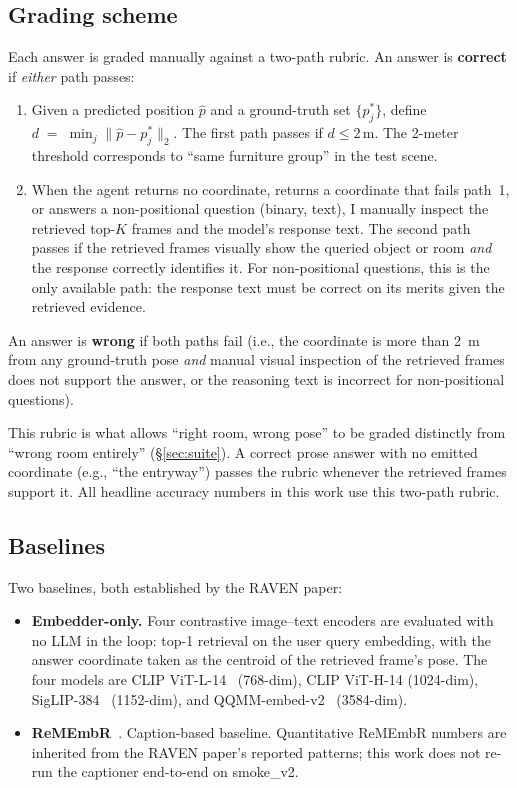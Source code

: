 \documentclass[12pt,letterpaper,oneside]{article}
\begin{document}
\subsection{Grading scheme}\label{sec:grading}

Each answer is graded manually against a two-path rubric.  An answer
is \textbf{correct} if \emph{either} path passes:

\begin{enumerate}
  \item Given a predicted position $\hat{p}$ and a ground-truth set
    $\{p^*_j\}$, define $d \;=\; \min_j \|\hat{p} - p^*_j\|_2$.
    The first path passes if $d \le 2\,$m.  The 2-meter threshold
    corresponds to ``same furniture group'' in the test scene.
  \item When the agent returns no coordinate, returns a coordinate
    that fails path~1, or answers a non-positional question (binary,
    text), I manually inspect the retrieved top-$K$ frames and the
    model's response text.  The second path passes if the retrieved
    frames visually show the queried object or room \emph{and} the
    response correctly identifies it.  For non-positional questions,
    this is the only available path: the response text must be
    correct on its merits given the retrieved evidence.
\end{enumerate}

An answer is \textbf{wrong} if both paths fail (i.e., the coordinate
is more than 2~m from any ground-truth pose \emph{and} manual visual
inspection of the retrieved frames does not support the answer, or
the reasoning text is incorrect for non-positional questions).

This rubric is what allows ``right room, wrong pose'' to be graded
distinctly from ``wrong room entirely'' (\S\ref{sec:suite}). A
correct prose answer with no emitted coordinate (e.g., ``the
entryway'') passes the rubric whenever the retrieved frames support
it.  All headline accuracy numbers in this work use this two-path
rubric.

\subsection{Baselines}

Two baselines, both established by the RAVEN paper:

\begin{itemize}
  \item \textbf{Embedder-only.}  Four contrastive image--text encoders
    are evaluated with no LLM in the loop: top-1 retrieval on the user
    query embedding, with the answer coordinate taken as the centroid
    of the retrieved frame's pose.  The four models are CLIP
    ViT-L-14~\cite{ref:clip} (768-dim), CLIP ViT-H-14 (1024-dim),
    SigLIP-384~\cite{ref:siglip} (1152-dim), and
    QQMM-embed-v2~\cite{ref:qqmm} (3584-dim).
  \item \textbf{ReMEmbR}~\cite{ref:remembr}.  Caption-based baseline.
    Quantitative ReMEmbR numbers are inherited from the RAVEN paper's
    reported patterns; this work does not re-run the captioner
    end-to-end on smoke\_v2.
\end{itemize}
\end{document}
